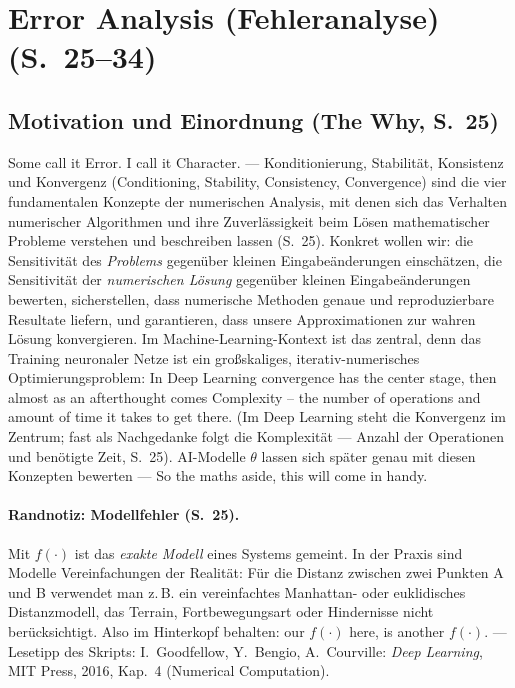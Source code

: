 \section{Error Analysis (Fehleranalyse) (S.~25--34)}

\subsection{Motivation und Einordnung (The Why, S.~25)}
\glqq Some call it Error. I call it Character.\grqq{} — Konditionierung, Stabilität, Konsistenz und Konvergenz (Conditioning, Stability, Consistency, Convergence) sind die vier fundamentalen Konzepte der numerischen Analysis, mit denen sich das Verhalten numerischer Algorithmen und ihre Zuverlässigkeit beim Lösen mathematischer Probleme verstehen und beschreiben lassen (S.~25). Konkret wollen wir: die Sensitivität des \emph{Problems} gegenüber kleinen Eingabeänderungen einschätzen, die Sensitivität der \emph{numerischen Lösung} gegenüber kleinen Eingabeänderungen bewerten, sicherstellen, dass numerische Methoden genaue und reproduzierbare Resultate liefern, und garantieren, dass unsere Approximationen zur wahren Lösung konvergieren. Im Machine-Learning-Kontext ist das zentral, denn das Training neuronaler Netze ist ein großskaliges, iterativ-numerisches Optimierungsproblem: \glqq In Deep Learning convergence has the center stage, then almost as an afterthought comes Complexity -- the number of operations and amount of time it takes to get there.\grqq{} (Im Deep Learning steht die Konvergenz im Zentrum; fast als Nachgedanke folgt die Komplexität — Anzahl der Operationen und benötigte Zeit, S.~25). AI-Modelle $\theta$ lassen sich später genau mit diesen Konzepten bewerten — \glqq So the maths aside, this will come in handy.\grqq

\paragraph{Randnotiz: Modellfehler (S.~25).} Mit $f(\cdot)$ ist das \emph{exakte Modell} eines Systems gemeint. In der Praxis sind Modelle Vereinfachungen der Realität: Für die Distanz zwischen zwei Punkten A und B verwendet man z.\,B. ein vereinfachtes Manhattan- oder euklidisches Distanzmodell, das Terrain, Fortbewegungsart oder Hindernisse nicht berücksichtigt. Also im Hinterkopf behalten: \glqq our $f(\cdot)$ here, is another $f(\cdot)$.\grqq{} — Lesetipp des Skripts: I.~Goodfellow, Y.~Bengio, A.~Courville: \emph{Deep Learning}, MIT Press, 2016, Kap.~4 (Numerical Computation).

